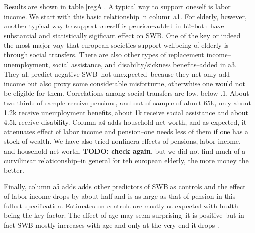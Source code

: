 \documentclass[10pt, letterpaper]{article}
\begin{document}
\begin{spacing}{1.4}
Results are shown in table \ref{regA}. A typical way to support oneself is labor
income. We start with this basic relationship in column a1. For elderly,
however, another typical way to support oneself is pension--added in b2--both
have substantial and statistically sigificant effect on SWB. 
%
One of the key or indeed the most major way that european societies support
wellbeing of elderly is through social transfers.
%
There are also
other types of replacement income--unemployment, social assistance, and disabilty/sickness
benefits--added in a3. They all predict negative SWB--not unexpected--because
they not only add income but also proxy some considerable misforturne,
otherwhise one would not be eligible for them. 
%
Correlations among social transfers are low, below .1. About two thirds of sample receive pensions, and out of sample of about 65k, only about 1.2k receive
unemployment benefits,  about 1k receive social assistance and about 4.5k
receive disability.
%
Column a4 adds household net
worth, and as expected, it attenuates effect of labor income and pension--one
needs less of them if one has a stock of wealth. 
%
We have also tried nonlinera effects of pensions, labor income, and household
net worth, \textbf{TODO: check again}, but we did not find much of a curvilinear
relatioonship--in general for teh european elderly, the more money the better.

Finally, column a5 adds adds
other predictors of SWB as controls and the effect of labor income drops by
about half
and is as large as that of pension in this fullest specification.
%
Estimates on controls are mostly as expected with health being the key
factor. The effect of age may seem surprising--it is  positive--but in fact SWB mostly
increases with age and only at the very end it drops \citep{gwozdz10}.



\end{spacing}
\end{document}
